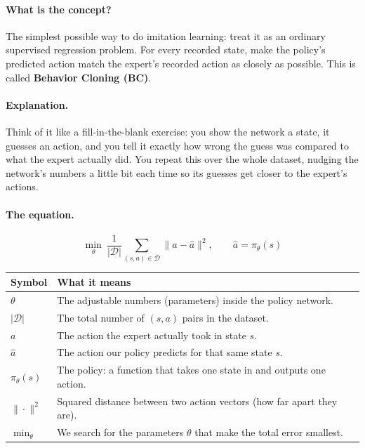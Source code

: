 \documentclass[11pt]{article}
\begin{document}
\paragraph{What is the concept?}
The simplest possible way to do imitation learning: treat it as an ordinary supervised
regression problem. For every recorded state, make the policy's predicted action match
the expert's recorded action as closely as possible. This is called \textbf{Behavior
Cloning (BC)}.

\paragraph{Explanation.}
Think of it like a fill-in-the-blank exercise: you show the network a state, it guesses
an action, and you tell it exactly how wrong the guess was compared to what the expert
actually did. You repeat this over the whole dataset, nudging the network's numbers a
little bit each time so its guesses get closer to the expert's actions.

\paragraph{The equation.}
$$\min_\theta \ \frac{1}{|\mathcal{D}|}\sum_{(s,a)\in\mathcal{D}} \|a - \hat a\|^2,
\qquad \hat a = \pi_\theta(s)$$

\begin{center}
\begin{tabular}{@{}p{3.2cm}p{10.3cm}@{}}
\toprule
Symbol & What it means \\
\midrule
$\theta$ & The adjustable numbers (parameters) inside the policy network. \\
$|\mathcal{D}|$ & The total number of $(s,a)$ pairs in the dataset. \\
$a$ & The action the expert actually took in state $s$. \\
$\hat a$ & The action our policy predicts for that same state $s$. \\
$\pi_\theta(s)$ & The policy: a function that takes one state in and outputs one action. \\
$\|\cdot\|^2$ & Squared distance between two action vectors (how far apart they are). \\
$\min_\theta$ & We search for the parameters $\theta$ that make the total error smallest. \\
\bottomrule
\end{tabular}
\end{center}
\end{document}
